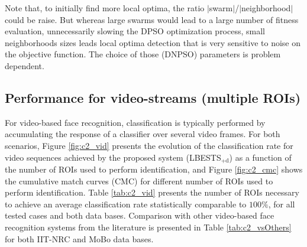 Note that, to initially find more local optima, the ratio $|$swarm$|$/$|$neighborhood$|$ could be raise.
But whereas large swarms would lead to a large number of fitness evaluation, unnecessarily slowing the DPSO optimization process, small neighborhoods sizes leads local optima detection that is very sensitive to noise on the objective function. 
The choice of those (DNPSO) parameters is problem dependent.

\subsection{Performance for video-streams (multiple ROIs)}

For video-based face recognition, classification is typically performed by accumulating the response of a classifier over several video frames.
For both scenarios, Figure \ref{fig:c2_vid} presents the evolution of the classification rate for video sequences achieved by the proposed system (LBESTS$_\text{+d}$) as a function of the number of ROIs used to perform identification, and Figure \ref{fig:c2_cmc} shows the cumulative match curves (CMC) for different number of ROIs used to perform identification.
Table \ref{tab:c2_vid} presents the number of ROIs necessary to achieve an average classification rate statistically comparable to $100\%$, for all tested cases and both data bases.
Comparison with other video-based face recognition systems from the literature is presented in Table \ref{tab:c2_vsOthers} for both IIT-NRC and MoBo data bases.

\begin{figure*}[t]
  \centering
	\caption{Evolution of the average classification rate for video sequences of the AMCS's ensemble versus the number of ROIs used to identify individuals of the IIT-NRC data base.
Performance is shown for incremental learning under both scenarios for the AMCS with LBESTS$_\text{+d}$.
Error bars correspond to the 90\% confidence interval}
	\label{fig:c2_vid}
\end{figure*}

